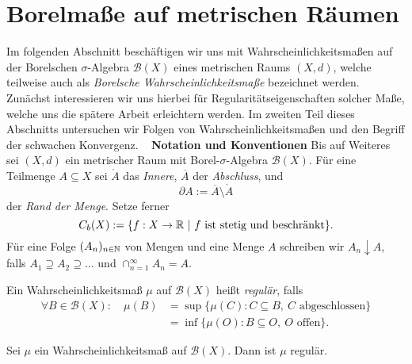 \section{Borelmaße auf metrischen Räumen}
Im folgenden Abschnitt beschäftigen wir uns mit Wahrscheinlichkeitsmaßen auf der Borelschen $\sigma$-Algebra $\mathcal{B}(X)$ eines metrischen Raums $(X,d)$, 
welche teilweise auch als \textit{Borelsche Wahrscheinlichkeitsmaße} bezeichnet werden. 
Zunächst interessieren wir uns hierbei für Regularitätseigenschaften solcher Maße, welche uns die spätere Arbeit erleichtern werden. 
Im zweiten Teil dieses Abschnitts untersuchen wir Folgen von Wahrscheinlichkeitsmaßen und den Begriff der schwachen Konvergenz. 
\newline \ \newline 
\textbf{Notation und Konventionen} 
\newline
Bis auf Weiteres sei $(X,d)$ ein metrischer Raum mit Borel-$\sigma$-Algebra $\mathcal{B}(X)$. 
Für eine Teilmenge $A \subseteq X$ sei $\mathring{A}$ das \textit{Innere}, $\overline{A}$ der \textit{Abschluss}, und 
$$
    \partial A := \overline{A} \setminus \mathring{A}
$$
der \textit{Rand der Menge}. 
Setze ferner 
$$
    C_b(X) := \{f:X \to \mathbb{R} \ | \ f \text{ ist stetig und beschränkt} \}.
$$ 
Für eine Folge $(A_n)_{n \in \mathbb{N}}$ von Mengen und eine Menge $A$ schreiben wir $A_n \downarrow A$, falls $A_1 \supseteq A_2 \supseteq ...$ und $\cap_{n=1}^{\infty}A_n = A$. 
\begin{mydef}
    Ein Wahrscheinlichkeitsmaß $\mu$ auf $\mathcal{B}(X)$ heißt \textit{regulär}, falls
    \begin{align*}
        \forall B \in \mathcal{B}(X): \quad \mu(B) &= \sup\{\mu(C): C \subseteq B, \ C \text{ abgeschlossen} \} \\\
                                                   &= \inf\{\mu(O): B \subseteq O, \ O \text{ offen} \}.  
    \end{align*}  
\end{mydef}

\begin{proposition}
    Sei $\mu$ ein Wahrscheinlichkeitsmaß auf $\mathcal{B}(X)$. Dann ist $\mu$ regulär. 
\end{proposition}

